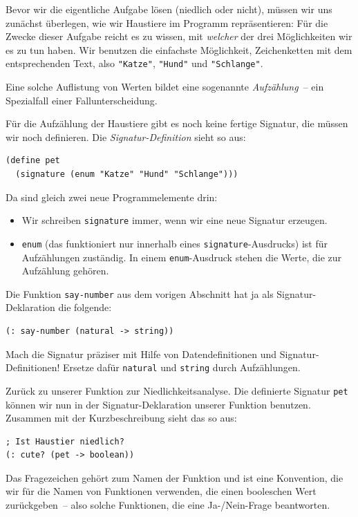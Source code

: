 Bevor wir die eigentliche Aufgabe lösen (niedlich oder nicht), müssen
wir uns zunächst überlegen, wie wir Haustiere im Programm
repräsentieren: Für die Zwecke dieser Aufgabe reicht es zu wissen, mit
\emph{welcher} der drei Möglichkeiten wir es zu tun haben.  Wir
benutzen die einfachste Möglichkeit, Zeichenketten mit dem
entsprechenden Text, also \lstinline{"Katze"}, \lstinline{"Hund"} und
\lstinline{"Schlange"}.

Eine solche Auflistung von Werten bildet eine sogenannte
\textit{Aufzählung}~-- ein Spezialfall einer
Fallunterscheidung.

Für die Aufzählung der Haustiere gibt es noch keine fertige Signatur,
die müssen wir noch definieren.  Die
\textit{Signatur-Definition} sieht so
aus:
\label{sec:pet}\label{page:signature}
%
\begin{lstlisting}
(define pet
  (signature (enum "Katze" "Hund" "Schlange")))
\end{lstlisting}
%
Da sind gleich zwei neue Programmelemente drin:
%
\begin{itemize}
\item Wir schreiben
  \lstinline{signature} immer, wenn wir eine
  neue Signatur erzeugen.
\item \lstinline{enum} (das funktioniert
  nur innerhalb eines \lstinline{signature}-Ausdrucks) ist für
  Aufzählungen zuständig.  In einem \lstinline{enum}-Ausdruck stehen
  die Werte, die zur Aufzählung gehören.
\end{itemize}
%
\begin{aufgabeinline}
  Die Funktion \lstinline{say-number} aus dem vorigen Abschnitt hat ja als
  Signatur-Deklaration die folgende:
\begin{lstlisting}
(: say-number (natural -> string))
\end{lstlisting}
  Mach die Signatur präziser mit Hilfe von Datendefinitionen und
  Signatur-Definitionen!  Ersetze dafür \lstinline{natural} und
  \lstinline{string} durch Aufzählungen.
\end{aufgabeinline}
%
Zurück zu unserer Funktion zur Niedlichkeitsanalyse.  Die definierte
Signatur \lstinline{pet} können wir nun in der Signatur-Deklaration
unserer Funktion benutzen.  Zusammen mit der Kurzbeschreibung sieht
das so aus:
%
\begin{lstlisting}
; Ist Haustier niedlich?
(: cute? (pet -> boolean))
\end{lstlisting}
%
Das Fragezeichen gehört zum Namen der Funktion und ist eine
Konvention, die wir für die Namen von Funktionen verwenden, die einen
booleschen Wert zurückgeben~-- also solche Funktionen, die eine
Ja-/Nein-Frage beantworten.

